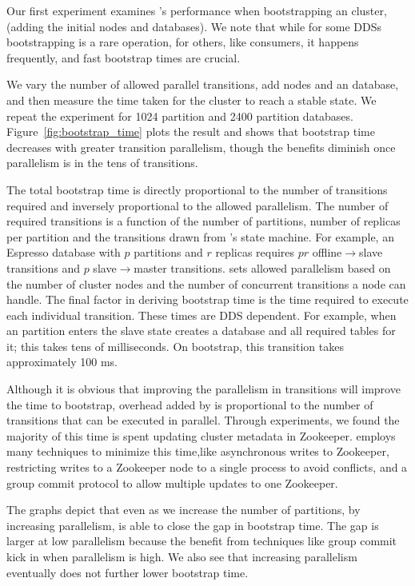 Our first experiment examines \helix's performance when bootstrapping an \ES cluster,
(\ie adding the initial nodes and databases).  We note that while for some DDSs
bootstrapping is a rare operation, for others, like \databus consumers, it
happens frequently, and fast bootstrap times are crucial.

We vary the number of allowed parallel transitions, add nodes and an \ES
database, and then measure the time taken for the cluster to reach a stable
state.  We repeat the experiment for 1024 partition and 2400 partition
databases. 
Figure~\ref{fig:bootstrap_time} plots the result and shows that bootstrap time
decreases with greater transition parallelism, though the benefits diminish once
parallelism is in the tens of transitions.

The total bootstrap time is directly proportional to the number of transitions
required and inversely proportional to the allowed parallelism.  The number of
required transitions is a function of the number of partitions, number of
replicas per partition and the transitions drawn from \ES's state machine.
For example, an Espresso database with $p$ partitions and $r$ replicas requires
$pr$ offline$\rightarrow$slave transitions and $p$ slave$\rightarrow$master
transitions.  \ES sets allowed parallelism based on the number of cluster nodes
and the number of concurrent transitions a node can handle.
The final factor in deriving bootstrap time is the time required to execute each
individual transition.  These times are DDS dependent. 
For example, when an \ES partition enters the slave state \ES creates a \mysql
database and all required tables for it; this takes tens of milliseconds.
On bootstrap, this transition takes approximately 100 ms.  

Although it is obvious that improving the parallelism in transitions will
improve the time to bootstrap, overhead added by \helix is proportional to the
number of transitions that can be executed in parallel. Through experiments, we
found the majority of this time is spent updating cluster metadata in
Zookeeper. \helix employs many techniques to minimize this time,like asynchronous 
writes to Zookeeper, restricting writes to a Zookeeper node to a single process to avoid
conflicts, and a group commit protocol to allow multiple updates to one
Zookeeper.

The graphs depict that even as we increase the number of partitions, by
increasing parallelism, \helix is able to close the gap in
bootstrap time. The gap is larger at low parallelism because the benefit from techniques like
group commit kick in when parallelism is high. We also see that increasing
parallelism eventually does not further lower bootstrap time.

